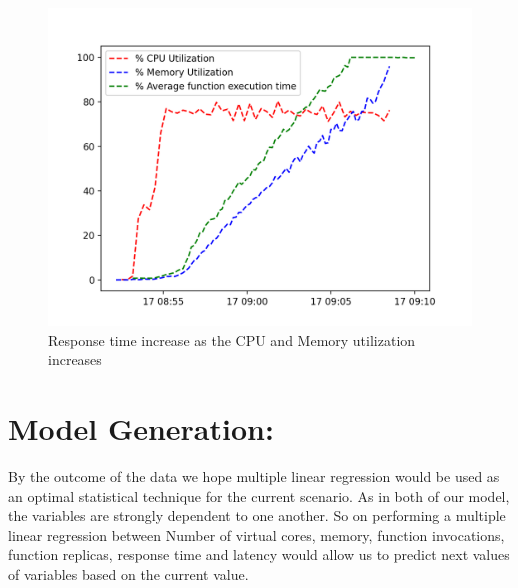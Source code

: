 \begin{figure}[htpb]
    \centering
    \includegraphics[width=1\textwidth]{figures/cpu_mem_response}
    \caption{Response time increase as the CPU and Memory utilization increases} \label{fig:cpu_mem_response}
\end{figure}

\newpage 

\section{Model Generation:}

By the outcome of the data we hope multiple linear regression would be used as an optimal statistical technique for the current scenario.
As in both of our model, the variables are strongly dependent to one another. 
So on performing a multiple linear regression between Number of virtual cores, memory, function invocations, function replicas, response time and latency would allow us to predict next values of variables based on the current value.

